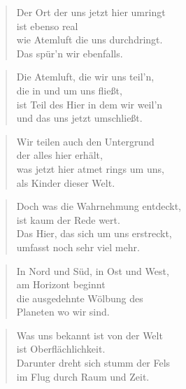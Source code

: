 \documentclass[10pt,a4paper]{article}
\begin{document}
\begin{multicols}{2}
\begin{verse}
Der Ort der uns jetzt hier umringt \\
ist ebenso real \\
wie Atemluft die uns durchdringt. \\
Das spür’n wir ebenfalls. \\
\end{verse}

\begin{verse}
Die Atemluft, die wir uns teil’n, \\
die in und um uns fließt, \\
ist Teil des Hier in dem wir weil’n \\
und das uns jetzt umschließt. \\
\end{verse}

\begin{verse}
Wir teilen auch den Untergrund \\
der alles hier erhält, \\
was jetzt hier atmet rings um uns, \\
als Kinder dieser Welt. \\
\end{verse}

\begin{verse}
Doch was die Wahrnehmung entdeckt, \\
ist kaum der Rede wert. \\
Das Hier, das sich um uns erstreckt, \\
umfasst noch sehr viel mehr. \\
\end{verse}

\begin{verse}
In Nord und Süd, in Ost und West, \\
am Horizont beginnt \\
die ausgedehnte Wölbung des \\
Planeten wo wir sind. \\
\end{verse}

\begin{verse}
Was uns bekannt ist von der Welt \\
ist Oberflächlichkeit. \\
Darunter dreht sich stumm der Fels \\
im Flug durch Raum und Zeit. \\
\end{verse}


\end{multicols}
\end{document}
